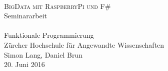 




\begin{titlepage}
   \mbox{}\vspace{5\baselineskip}\\
   \rmfamily\huge
   \centering
   \textsc{BigData mit RaspberryPi und F\#} \\[2ex]
   Seminararbeit
   \rmfamily\Large
   \vspace{1\baselineskip}\\
   \mbox{}
   \vspace{3\baselineskip}\\
   Funktionale Programmierung\\
   Zürcher Hochschule für Angewandte Wissenschaften
   \vspace{5\baselineskip}\\
   \rmfamily\Large
   Simon Lang, Daniel Brun
   \vspace{1\baselineskip}\\
   20. Juni 2016
\end{titlepage}
 



% 
